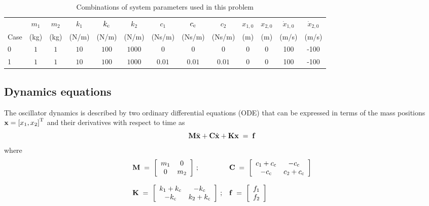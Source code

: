 \documentclass[fleqn,11pt]{article}
\renewcommand{\arraystretch}{1.136}
\newcommand{\sqbr}[1]		{ \left[ #1 \right] }
\newcommand{\cvvect}[1]		{ \begin{array}{c} #1 \end{array} }
\newcommand{\matr}[2]		{ \begin{array}{ #1 } #2 \end{array} }
\newcommand{\trans}			{^{\rm T}}
\newcommand{\eq}			{ \; = \; }
\begin{document}
\begin{table}[ht]
\begin{center}	
	{ \footnotesize{
			\renewcommand{\arraystretch}{1.25}
			\begin{tabular}{lcccccccccccc}
				\hline
				& $m_1$ 	& $m_2$ 	&$k_1$ & $k_{\rm c}$  &$k_2$ &$c_1$ & $c_{\rm c}$ &$c_2$ 
				&$x_{1,0}$ 	&$x_{2,0}$	&$\dot{x}_{1,0}$ 	&$\dot{x}_{2,0}$	\\
				Case	& (kg)		& (kg)	&(N/m) &(N/m) 	&(N/m) &(Ns/m) &(Ns/m) &(Ns/m)  
				& (m) 		& (m)	&(m/s) &(m/s)\\
				\hline
				0	& $1$ 	& $1$ 	& $10$ & $100$ & $1000$ &0 &0 &0 &0 &0 &100 &-100 \\
				1	& $1$ 	& $1$ 	& $10$ & $100$ & $1000$ &$0.01$ &$0.01$ &$0.01$ &0 &0 &100 &-100 \\
				\hline
			\end{tabular}
	}}
\end{center}
\caption{Combinations of system parameters used in this problem}
\label{tab:systemParameters}
\end{table}


\subsection{Dynamics equations}
\label{DynEquations}

The oscillator dynamics is described by two ordinary differential equations (ODE) that can be expressed in terms of the mass positions ${\bf x} = \sqbr{x_1, x_2}\trans$ and their derivatives with respect to time as
%
\begin{equation}
	{\bf M}\ddot{\bf x} + {\bf C}\dot{\bf x} + {\bf K}{\bf x} \eq {\bf f}
	\label{eq:linearOscillatorDynEqsCompact}
\end{equation}
%
where
%
\begin{equation}
	\matr{ll}
	{
	{\bf M} \eq \sqbr{\matr{cc}{m_1 &0 \\ 0 &m_2}}\,;
	&{\bf C} \eq \sqbr{\matr{cc}{c_1 + c_{\rm c} &-c_{\rm c} \\ -c_{\rm c} &c_2 + c_{\rm c}}} 
	\\
	\\ 
	{\bf K} \eq \sqbr{\matr{cc}{k_1 + k_{\rm c} &-k_{\rm c} \\ -k_{\rm c} &k_2 + k_{\rm c}}}\,;
	& {\bf f} \eq \sqbr{\cvvect{f_1 \\ f_2}} 
	}
	\label{eq:linearOscillatorDynEqsTerms}
\end{equation}
%
\end{document}

